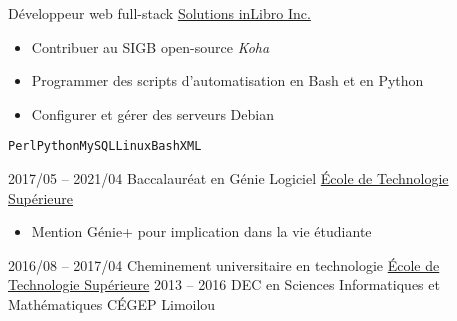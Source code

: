 \documentclass[9pt]{developercv} %
\begin{document}
\begin{minipage}[t]{0.8\textwidth}
\begin{entrylist}
		{Développeur web full-stack}
		{\href{https://inlibro.com/}{Solutions inLibro Inc.}}
		{
			\vspace{-14pt}
			\begin{itemize}
				\renewcommand{\labelitemi}{\raisebox{.45ex}{\rule{.6ex}{.6ex}}}
				\setlength\itemsep{-1pt}
				\item Contribuer au SIGB open-source \emph{Koha}
				\item Programmer des scripts d'automatisation en Bash et en Python
				\item Configurer et gérer des serveurs Debian
			\end{itemize}
			\vspace{-4pt}
			\texttt{Perl}\slashsep\texttt{Python}\slashsep\texttt{MySQL}\slashsep\texttt{Linux}\slashsep\texttt{Bash}\slashsep\texttt{XML}
		}
\end{entrylist}



\begin{entrylist}
	\entry
		{2017/05 -- 2021/04}
		{Baccalauréat en Génie Logiciel}
		{\href{https://etsmtl.ca}{École de Technologie Supérieure}}
		{
			\vspace{-14pt}
			\begin{itemize}
				\renewcommand{\labelitemi}{\raisebox{.45ex}{\rule{.6ex}{.6ex}}}
				\setlength\itemsep{-1pt}
				\item Mention Génie+ pour implication dans la vie étudiante
			\end{itemize}
			\vspace{-8pt}
		}
	\entry
		{2016/08 -- 2017/04}
		{Cheminement universitaire en technologie}
		{\href{https://etsmtl.ca}{École de Technologie Supérieure}}
		{\vspace{-14pt}}
	\entry
		{2013 -- 2016}
		{DEC en Sciences Informatiques et Mathématiques}
		{CÉGEP Limoilou}
		{\vspace{-14pt}}
\end{entrylist}




\end{minipage}
\end{document}
